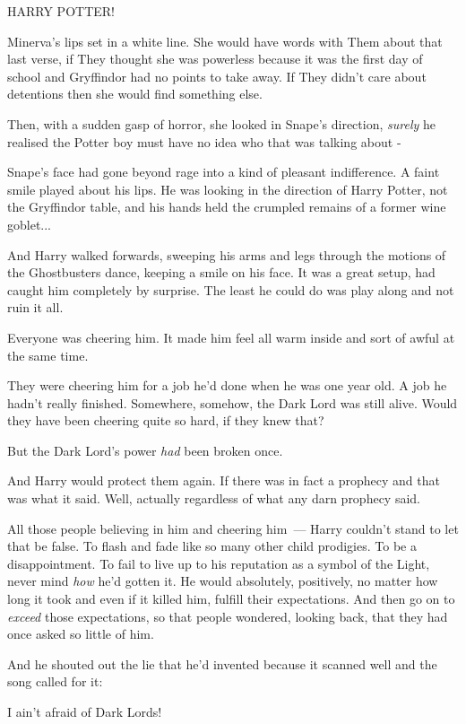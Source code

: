 HARRY POTTER!

Minerva's lips set in a white line. She would have words with Them about that last verse, if They thought she was powerless because it was the first day of school and Gryffindor had no points to take away. If They didn't care about detentions then she would find something else.

Then, with a sudden gasp of horror, she looked in Snape's direction, \emph{surely} he realised the Potter boy must have no idea who that was talking about -

Snape's face had gone beyond rage into a kind of pleasant indifference. A faint smile played about his lips. He was looking in the direction of Harry Potter, not the Gryffindor table, and his hands held the crumpled remains of a former wine goblet...

And Harry walked forwards, sweeping his arms and legs through the motions of the Ghostbusters dance, keeping a smile on his face. It was a great setup, had caught him completely by surprise. The least he could do was play along and not ruin it all.

Everyone was cheering him. It made him feel all warm inside and sort of awful at the same time.

They were cheering him for a job he'd done when he was one year old. A job he hadn't really finished. Somewhere, somehow, the Dark Lord was still alive. Would they have been cheering quite so hard, if they knew that?

But the Dark Lord's power \emph{had} been broken once.

And Harry would protect them again. If there was in fact a prophecy and that was what it said. Well, actually regardless of what any darn prophecy said.

All those people believing in him and cheering him~--- Harry couldn't stand to let that be false. To flash and fade like so many other child prodigies. To be a disappointment. To fail to live up to his reputation as a symbol of the Light, never mind \emph{how} he'd gotten it. He would absolutely, positively, no matter how long it took and even if it killed him, fulfill their expectations. And then go on to \emph{exceed} those expectations, so that people wondered, looking back, that they had once asked so little of him.

And he shouted out the lie that he'd invented because it scanned well and the song called for it:

I ain't afraid of Dark Lords!

